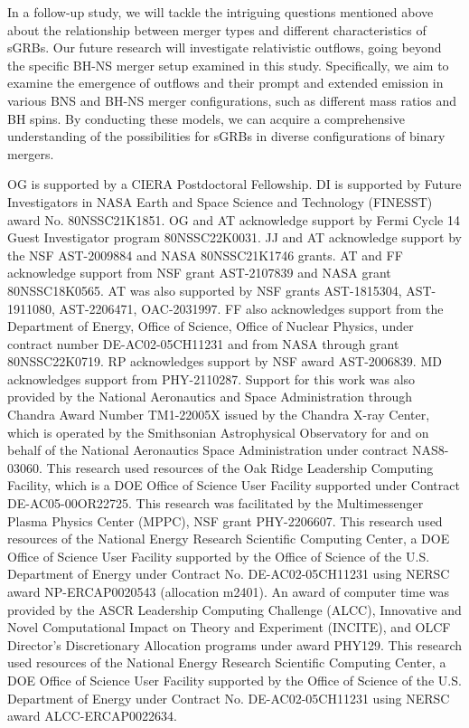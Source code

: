 \documentclass[twocolumn,dvipsnames]{aastex62}
\begin{document}
In a follow-up study, we will tackle the intriguing questions mentioned above about the relationship between merger types and different characteristics of sGRBs. Our future research will investigate relativistic outflows, going beyond the specific BH-NS merger setup examined in this study. Specifically, we aim to examine the emergence of outflows and their prompt and extended emission in various BNS and BH-NS merger configurations, such as different mass ratios and BH spins. By conducting these models, we can acquire a comprehensive understanding of the possibilities for sGRBs in diverse configurations of binary mergers.

\begin{acknowledgements}

OG is supported by a CIERA Postdoctoral Fellowship.
DI is supported by Future Investigators in NASA Earth and Space Science and Technology (FINESST) award No. 80NSSC21K1851. %
OG and AT acknowledge support by Fermi Cycle 14 Guest Investigator program 80NSSC22K0031.
JJ and AT acknowledge support by the NSF AST-2009884 and NASA 80NSSC21K1746 grants.
AT and FF acknowledge support from 
NSF grant AST-2107839 %
and NASA grant 80NSSC18K0565. %
AT was also supported by NSF grants
AST-1815304, %
AST-1911080, %
AST-2206471, %
OAC-2031997.  %
FF also acknowledges support from the Department of Energy, Office of Science, Office of Nuclear Physics, under contract number DE-AC02-05CH11231 and from NASA through grant 80NSSC22K0719.
RP acknowledges support by NSF award AST-2006839.
MD acknowledges support from PHY-2110287.
Support for this work was also provided by the National Aeronautics and Space Administration through Chandra Award Number TM1-22005X issued by the Chandra X-ray Center, which is operated by the Smithsonian Astrophysical Observatory for and on behalf of the National Aeronautics Space Administration under contract NAS8-03060.
This research used resources of the Oak Ridge Leadership Computing Facility, which is a DOE Office of Science User Facility supported under Contract DE-AC05-00OR22725.  This research was facilitated by the Multimessenger Plasma Physics Center (MPPC), NSF grant PHY-2206607.  This research used resources of the National Energy Research Scientific Computing Center, a DOE Office of Science User Facility supported by the Office of Science of the U.S. Department of Energy under Contract No. DE-AC02-05CH11231 using
NERSC award NP-ERCAP0020543 (allocation m2401).
An award of computer time was provided by the ASCR Leadership Computing Challenge (ALCC), Innovative and Novel Computational Impact on Theory and Experiment (INCITE), and OLCF Director's Discretionary Allocation  programs under award PHY129. This research used resources of the National Energy Research Scientific Computing Center, a DOE Office of Science User Facility supported by the Office of Science of the U.S. Department of Energy under Contract No. DE-AC02-05CH11231 using NERSC award ALCC-ERCAP0022634.
    
\end{acknowledgements}
\end{document}
